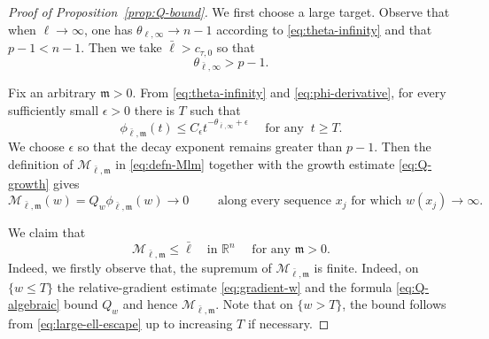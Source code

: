 \documentclass[reqno,12pt]{amsart}
\numberwithin{equation}{section}
\theoremstyle{remark}
\newcommand{\R}{\mathbb R}
\newcommand{\Mscr}{\mathscr M}
\begin{document}
\begin{proof}[Proof of Proposition~\ref{prop:Q-bound}]
We first choose a large target.  Observe that when $\ell\to \infty$, one has $\theta_{\ell,\infty}\to n-1$ according to \eqref{eq:theta-infinity} and  that  $p-1<n-1$. Then we take
$\bar\ell>c_{\tau,0}$ so that
$$
\theta_{\bar\ell,\infty}>p-1.
$$

\medskip
{}
Fix an arbitrary $\mathfrak m>0$.  From \eqref{eq:theta-infinity} and \eqref{eq:phi-derivative}, for every sufficiently small $\epsilon>0$ there is $T$ such that
\begin{equation}\label{eq:phi-decay}
\phi_{\bar\ell,\mathfrak m}(t)
\le C_\epsilon t^{-\theta_{\bar\ell,\infty}+\epsilon}
\quad\text{ for any } \ t\ge T.
\end{equation}
We choose $\epsilon$ so that the decay exponent remains greater than $p-1$.  Then the definition of $\Mscr_{\bar\ell,\mathfrak m}$ in \eqref{eq:defn-Mlm} together with the growth estimate \eqref{eq:Q-growth} gives
\begin{equation}\label{eq:large-ell-escape}
\Mscr_{\bar \ell, \mathfrak m}(w)=Q_w\phi_{\bar\ell,\mathfrak m}(w)\to 0
\qquad\text{ along every sequence } x_j  \text{ for which }  w(x_j)\to\infty.
\end{equation}

\medskip
{}
We claim that
\begin{equation}\label{eq:M-large-target}
\Mscr_{\bar\ell,\mathfrak m}\le\bar\ell
\quad\text{in }\R^n \quad \text{ for any } \mathfrak m>0.
\end{equation}
Indeed, we firstly observe that, the supremum of $\Mscr_{\bar\ell,\mathfrak m}$ is finite.  Indeed, on $\{w\le T\}$ the relative-gradient estimate \eqref{eq:gradient-w} and the  formula \eqref{eq:Q-algebraic} bound $Q_w$ and hence $\Mscr_{\bar\ell,\mathfrak m}$. Note that on $\{w>T\}$, the bound follows from \eqref{eq:large-ell-escape} up to increasing $T$ if necessary.  


\end{proof}
\end{document}
